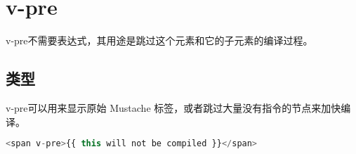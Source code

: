\begin{lstlisting}[language=JavaScript]

\end{lstlisting}




\begin{lstlisting}[language=JavaScript]

\end{lstlisting}

\chapter{v-pre}



v-pre不需要表达式，其用途是跳过这个元素和它的子元素的编译过程。

\section{类型}

v-pre可以用来显示原始 Mustache 标签，或者跳过大量没有指令的节点来加快编译。


\begin{lstlisting}[language=JavaScript]
<span v-pre>{{ this will not be compiled }}</span>
\end{lstlisting}



\begin{lstlisting}[language=JavaScript]

\end{lstlisting}




\begin{lstlisting}[language=JavaScript]

\end{lstlisting}




\begin{lstlisting}[language=JavaScript]

\end{lstlisting}




\begin{lstlisting}[language=JavaScript]

\end{lstlisting}




\begin{lstlisting}[language=JavaScript]

\end{lstlisting}




